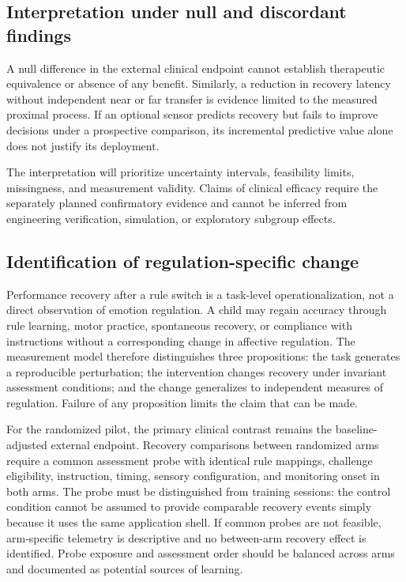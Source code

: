 \subsection{Interpretation under null and discordant findings}

A null difference in the external clinical endpoint cannot establish therapeutic equivalence or absence of any benefit. Similarly, a reduction in recovery latency without independent near or far transfer is evidence limited to the measured proximal process. If an optional sensor predicts recovery but fails to improve decisions under a prospective comparison, its incremental predictive value alone does not justify its deployment.

The interpretation will prioritize uncertainty intervals, feasibility limits, missingness, and measurement validity. Claims of clinical efficacy require the separately planned confirmatory evidence and cannot be inferred from engineering verification, simulation, or exploratory subgroup effects.

\subsection{Identification of regulation-specific change}

Performance recovery after a rule switch is a task-level operationalization, not a direct observation of emotion regulation. A child may regain accuracy through rule learning, motor practice, spontaneous recovery, or compliance with instructions without a corresponding change in affective regulation. The measurement model therefore distinguishes three propositions: the task generates a reproducible perturbation; the intervention changes recovery under invariant assessment conditions; and the change generalizes to independent measures of regulation. Failure of any proposition limits the claim that can be made.

For the randomized pilot, the primary clinical contrast remains the baseline-adjusted external endpoint. Recovery comparisons between randomized arms require a common assessment probe with identical rule mappings, challenge eligibility, instruction, timing, sensory configuration, and monitoring onset in both arms. The probe must be distinguished from training sessions: the control condition cannot be assumed to provide comparable recovery events simply because it uses the same application shell. If common probes are not feasible, arm-specific telemetry is descriptive and no between-arm recovery effect is identified. Probe exposure and assessment order should be balanced across arms and documented as potential sources of learning.

